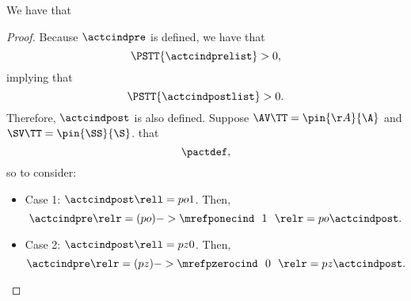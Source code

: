 \begin{proposition}
  We have that %
\end{proposition}

\begin{proof}
  Because $\actcindpre$ is defined,
  we have that 
  $$\PSTT{\actcindprelist} > 0,$$ 
  implying that
  $$\PSTT{\actcindpostlist} > 0.$$
  Therefore,
  $\actcindpost$ is also defined.
  Suppose 
  $\AV\TT = \pin{\AA}{\A}$
  and
  $\SV\TT = \pin{\SS}{\S}$.
   that 
  $$\pactdef,$$
  so  to consider:
  \begin{itemize}
    \item Case 1: $\actcindpost \rell = po 1$.
      Then,
      $$\actcindpre \relr = (po)->{\mrefponecind} \ \ 1\ \ \relr = po \actcindpost.$$
    \item Case 2: $\actcindpost \rell = pz 0$.
      Then,
      $$\actcindpre \relr = (pz)->{\mrefpzerocind} \ \ 0\ \ \relr = pz \actcindpost.$$
  \end{itemize}
\end{proof}
